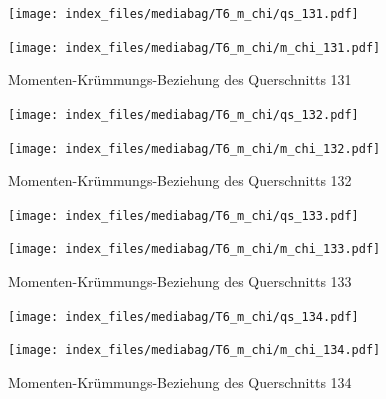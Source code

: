 \documentclass[
  11pt,
  letterpaper,
]{scrreprt}
\begin{document}
\begin{figure}[H]

\begin{minipage}{0.50\linewidth}
\texttt{[image: index\_files/mediabag/T6\_m\_chi/qs\_131.pdf]}\end{minipage}%
%
\begin{minipage}{0.50\linewidth}
\texttt{[image: index\_files/mediabag/T6\_m\_chi/m\_chi\_131.pdf]}\end{minipage}%

\caption{\label{fig-mchi_anhang}Momenten-Krümmungs-Beziehung des
Querschnitts 131}

\end{figure}%

\begin{figure}[H]

\begin{minipage}{0.50\linewidth}
\texttt{[image: index\_files/mediabag/T6\_m\_chi/qs\_132.pdf]}\end{minipage}%
%
\begin{minipage}{0.50\linewidth}
\texttt{[image: index\_files/mediabag/T6\_m\_chi/m\_chi\_132.pdf]}\end{minipage}%

\caption{\label{fig-mchi_anhang}Momenten-Krümmungs-Beziehung des
Querschnitts 132}

\end{figure}%

\begin{figure}[H]

\begin{minipage}{0.50\linewidth}
\texttt{[image: index\_files/mediabag/T6\_m\_chi/qs\_133.pdf]}\end{minipage}%
%
\begin{minipage}{0.50\linewidth}
\texttt{[image: index\_files/mediabag/T6\_m\_chi/m\_chi\_133.pdf]}\end{minipage}%

\caption{\label{fig-mchi_anhang}Momenten-Krümmungs-Beziehung des
Querschnitts 133}

\end{figure}%

\begin{figure}[H]

\begin{minipage}{0.50\linewidth}
\texttt{[image: index\_files/mediabag/T6\_m\_chi/qs\_134.pdf]}\end{minipage}%
%
\begin{minipage}{0.50\linewidth}
\texttt{[image: index\_files/mediabag/T6\_m\_chi/m\_chi\_134.pdf]}\end{minipage}%

\caption{\label{fig-mchi_anhang}Momenten-Krümmungs-Beziehung des
Querschnitts 134}

\end{figure}%
\end{document}

